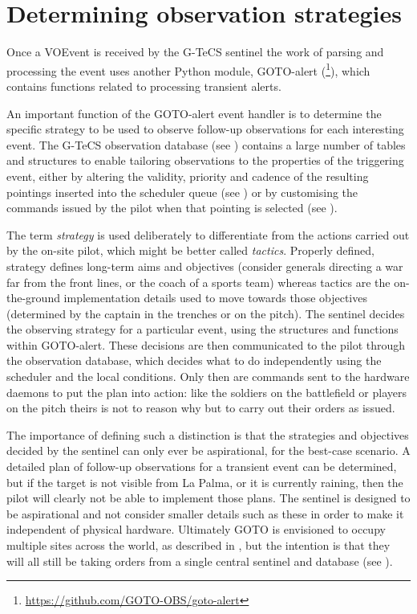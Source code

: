 \section{Determining observation strategies}
\label{sec:event_strategy}
\begin{colsection}


\begin{colsection}

Once a VOEvent is received by the G-TeCS sentinel the work of parsing and processing the event uses another Python module, GOTO-alert (\footnote{\url{https://github.com/GOTO-OBS/goto-alert}}), which  contains functions related to processing transient alerts.

An important function of the GOTO-alert event handler is to determine the specific strategy to be used to observe follow-up observations for each interesting event. The G-TeCS observation database (see ) contains a large number of tables and structures to enable tailoring observations to the properties of the triggering event, either by altering the validity, priority and cadence of the resulting pointings inserted into the scheduler queue (see ) or by customising the commands issued by the pilot when that pointing is selected (see ).

The term \textit{strategy} is used deliberately to differentiate from the actions carried out by the on-site pilot, which might be better called \textit{tactics}. Properly defined, strategy defines long-term aims and objectives (consider generals directing a war far from the front lines, or the coach of a sports team) whereas tactics are the on-the-ground implementation details used to move towards those objectives (determined by the captain in the trenches or on the pitch). The sentinel decides the observing strategy for a particular event, using the structures and functions within GOTO-alert. These decisions are then communicated to the pilot through the observation database, which decides what to do independently using the scheduler and the local conditions. Only then are commands sent to the hardware daemons to put the plan into action: like the soldiers on the battlefield or players on the pitch theirs is not to reason why but to carry out their orders as issued.

The importance of defining such a distinction is that the strategies and objectives decided by the sentinel can only ever be aspirational, for the best-case scenario. A detailed plan of follow-up observations for a transient event can be determined, but if the target is not visible from La Palma, or it is currently raining, then the pilot will clearly not be able to implement those plans. The sentinel is designed to be aspirational and not consider smaller details such as these in order to make it independent of physical hardware. Ultimately GOTO is envisioned to occupy multiple sites across the world, as described in , but the intention is that they will all still be taking orders from a single central sentinel and database (see ).


\end{colsection}
\end{colsection}
